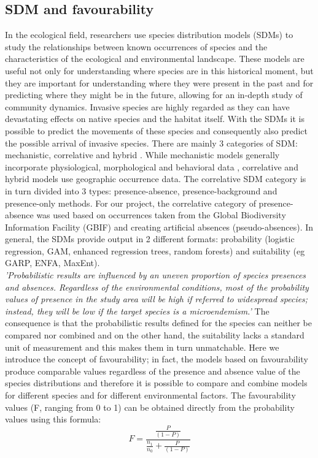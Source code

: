 \documentclass[12pt,a4paper]{article}
\begin{document}
\subsection{SDM and favourability}
In the ecological field, researchers use species distribution models (SDMs) to study the relationships between known occurrences of species and the characteristics of the ecological and environmental landscape.
These models are useful not only for understanding where species are in this historical moment, but they are important for understanding where they were present in the past and for predicting where they might be in the future, allowing for an in-depth study of community dynamics.
Invasive species are highly regarded as they can have devastating effects on native species and the habitat itself.
With the SDMs it is possible to predict the movements of these species and consequently also predict the possible arrival of invasive species.
There are mainly 3 categories of SDM: mechanistic, correlative and hybrid \citep{dor12}. While mechanistic models generally incorporate physiological, morphological and behavioral data \citep{kea}, correlative and hybrid models use geographic occurrence data.
The correlative SDM category is in turn divided into 3 types: presence-absence, presence-background and presence-only methods.
For our project, the correlative category of presence-absence was used based on occurrences taken from the Global Biodiversity Information Facility (GBIF) and creating artificial absences (pseudo-absences).
In general, the SDMs provide output in 2 different formats: probability (logistic regression, GAM, enhanced regression trees, random forests) and suitability (eg GARP, ENFA, MaxEnt). \\ \textit{'Probabilistic results are influenced by an uneven proportion of species presences and absences. Regardless of the environmental conditions, most of the probability values of presence in the study area will be high if referred to widespread species; instead, they will be low if the target species is a microendemism.'} \citep{fav}
The consequence is that the probabilistic results defined for the species can neither be compared nor combined and on the other hand, the suitability lacks a standard unit of measurement and this makes them in turn unmatchable.
Here we introduce the concept of favourability; in fact, the models based on favourability produce comparable values regardless of the presence and absence value of the species distributions and therefore it is possible to compare and combine models for different species and for different environmental factors.
The favourability values (F, ranging from 0 to 1) can be obtained directly from the probability values using this formula:
\\ \[ F=\dfrac{\frac{P}{(1-P)}}{\frac{n_1}{n_0}+\frac{P}{(1-P)}}\] \\
\end{document}
